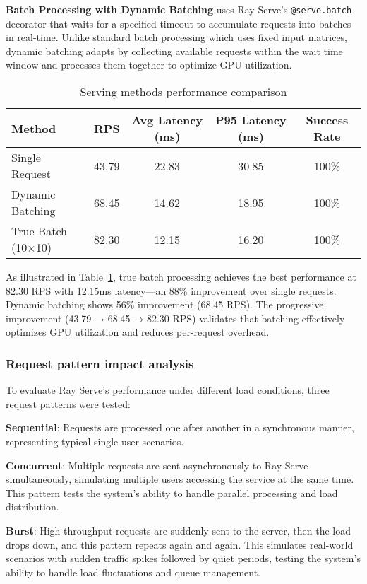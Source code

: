 \textbf{Batch Processing with Dynamic Batching} uses Ray Serve's \texttt{@serve.batch} decorator that waits for a specified timeout to accumulate requests into batches in real-time. Unlike standard batch processing which uses fixed input matrices, dynamic batching adapts by collecting available requests within the wait time window and processes them together to optimize GPU utilization.



\begin{table}[htbp]
\centering
\caption{Serving methods performance comparison}
\label{tab:serving_methods}
\begin{tabular}{|l|c|c|c|c|}
\hline
\textbf{Method} & \textbf{RPS} & \textbf{Avg Latency (ms)} & \textbf{P95 Latency (ms)} & \textbf{Success Rate} \\
\hline
Single Request & 43.79 & 22.83 & 30.85 & 100\% \\
Dynamic Batching & 68.45 & 14.62 & 18.95 & 100\% \\
True Batch (10×10) & 82.30 & 12.15 & 16.20 & 100\% \\
\hline
\end{tabular}
\end{table}

As illustrated in Table~\ref{tab:serving_methods}, true batch processing achieves the best performance at 82.30 RPS with 12.15ms latency—an 88\% improvement over single requests. Dynamic batching shows 56\% improvement (68.45 RPS). The progressive improvement (43.79 → 68.45 → 82.30 RPS) validates that batching effectively optimizes GPU utilization and reduces per-request overhead.

\subsubsection{Request pattern impact analysis}

To evaluate Ray Serve's performance under different load conditions, three request patterns were tested:

\textbf{Sequential}: Requests are processed one after another in a synchronous manner, representing typical single-user scenarios.

\textbf{Concurrent}: Multiple requests are sent asynchronously to Ray Serve simultaneously, simulating multiple users accessing the service at the same time. This pattern tests the system's ability to handle parallel processing and load distribution.

\textbf{Burst}: High-throughput requests are suddenly sent to the server, then the load drops down, and this pattern repeats again and again. This simulates real-world scenarios with sudden traffic spikes followed by quiet periods, testing the system's ability to handle load fluctuations and queue management.

